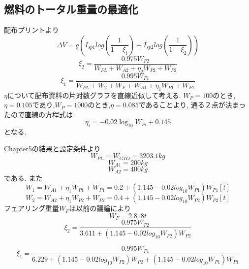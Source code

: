 \documentclass[15pt,uplatex,dvipdfmx]{jsarticle}
\begin{document}
\subsection{燃料のトータル重量の最適化}
配布プリントより
\begin{equation}
  \Delta V = g(I_{sp1}log(\frac{1}{1-\xi_1}) + I_{sp2}log(\frac{1}{1-\xi_2}))
\end{equation}
\begin{equation}
 \xi_2 = \frac{0.975W_{P2}}{W_{PL} + W_{A2} + \eta_2 W_{P2} + W_{P2}}
\end{equation}
\begin{equation}
\xi_1 = \frac{0.995W_{P1}}{W_{PL} +W_2 + W_F + W_{A1} + \eta_1 W_{P1} + W_{P1}}
\end{equation}
$\eta$について配布資料の片対数グラフを直線近似して考える.
$W_P=100$のとき,$\eta = 0.105$であり,$W_P=1000$のとき,$\eta = 0.085$であることより,
通る２点が決まったので直線の方程式は
\begin{equation}
  \eta_i = -0.02 \log_{10} W_{Pi} + 0.145
\end{equation}
となる.

Chapter5の結果と設定条件より
\begin{equation}
  W_{PL} = W_{GTO} = 3203.1kg
\end{equation}
\begin{equation}
  W_{A1} = 200kg
\end{equation}
\begin{equation}
  W_{A2} = 400kg
\end{equation}
である.
また
\begin{equation}
  W_{1} = W_{A1} + \eta_1 W_{P1} + W_{P1} = 0.2 + (1.145 - 0.02 log_{10} W_{P1})W_{P1} [t]
\end{equation}
\begin{equation}
  W_{2} = W_{A2} + \eta_1 W_{P2} + W_{P2} = 0.4 + (1.145 - 0.02 log_{10} W_{P2})W_{P2} [t]
\end{equation}
フェアリング重量$W_F$は以前の議論により
\begin{equation}
  W_F = 2.818t
\end{equation}
\begin{equation}
 \xi_2 = \frac{0.975W_{P2}}{3.611 + (1.145 - 0.02 log_{10} W_{P2})W_{P2}}
\end{equation}

\begin{equation}
\xi_1 = \frac{0.995W_{P1}}{6.229 +(1.145 - 0.02 log_{10} W_{P2})W_{P2} + (1.145 - 0.02 log_{10} W_{P1})W_{P1}}
\end{equation}
\end{document}
